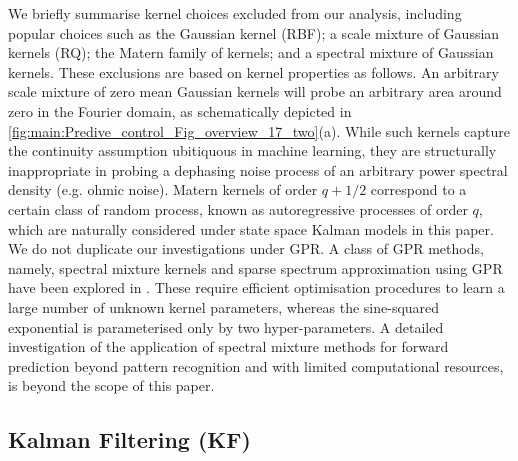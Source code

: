 We briefly summarise kernel choices excluded from our analysis, including popular choices such as the Gaussian kernel (RBF); a scale mixture of Gaussian kernels (RQ); the Matern family of kernels; and a spectral mixture of Gaussian kernels. These exclusions are based on kernel properties as follows. An arbitrary scale mixture of zero mean Gaussian kernels will probe an arbitrary area around zero in the Fourier domain, as schematically depicted in \cref{fig:main:Predive_control_Fig_overview_17_two}(a). While such kernels capture the continuity assumption ubitiquous in machine learning, they are structurally inappropriate in probing a dephasing noise process of an arbitrary power spectral density (e.g. ohmic noise).  Matern kernels of order $q + 1/2$ correspond to a certain class of random process, known as autoregressive processes of order $q$, which are naturally considered under state space Kalman models in this paper. We do not duplicate our investigations under GPR. A class of GPR methods, namely, spectral mixture kernels and sparse spectrum approximation using GPR have been explored in \cite{wilson2013, quia2010}. These require efficient optimisation procedures to learn a large number of unknown kernel parameters, whereas the sine-squared exponential is parameterised only by two hyper-parameters. A detailed investigation of the application of  spectral mixture methods for forward prediction beyond pattern recognition and with limited computational resources, is beyond the scope of this paper.  

\subsection{ Kalman Filtering (KF)}

